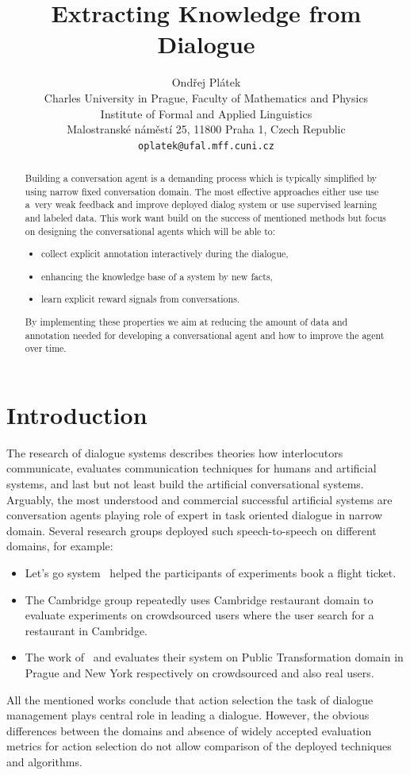 \documentclass[11pt]{article}
\title{Extracting Knowledge from Dialogue}
\author{Ondřej Plátek \\
  Charles University in Prague, Faculty of Mathematics and Physics \\
  Institute of Formal and Applied Linguistics \\
  Malostranské náměstí 25, 11800 Praha 1, Czech Republic\\
  {\tt oplatek@ufal.mff.cuni.cz}\\}
\date{}
\begin{document}
\maketitle
\begin{abstract}
Building a conversation agent is a demanding process which is typically simplified by using narrow fixed conversation domain.
The most effective approaches either use use a~very weak feedback and improve deployed dialog system or use supervised learning and labeled data.
This work want build on the success of mentioned methods but focus on designing the conversational agents which will be able to:
\begin{itemize}
    \item collect explicit annotation interactively during the dialogue,
    \item enhancing the knowledge base of a system by new facts,
    \item learn explicit reward signals from conversations.
\end{itemize}
By implementing these properties we aim at reducing the amount of data and annotation needed for developing a conversational agent and how to improve the agent over time.
\end{abstract}

\section{Introduction}
\label{sec:introduction}
The research of dialogue systems describes theories how interlocutors communicate, evaluates communication techniques for humans and artificial systems, and last but not least build the artificial conversational systems.
Arguably, the most understood and commercial successful artificial systems are conversation agents playing role of expert in task oriented dialogue in narrow domain.
Several research groups deployed such speech-to-speech on different domains, for example:
\begin{itemize}
    \item Let's go system~\cite{raux_lets_2005} helped the participants of experiments book a flight ticket.
    \item The Cambridge group repeatedly uses Cambridge restaurant domain to evaluate experiments on crowdsourced users where the user search for a restaurant in Cambridge.
    \item The work of~\cite{dusek_sequence2sequence_2016} and \cite{vejman_martin_development_2015} evaluates their system on Public Transformation domain in Prague and New York respectively on crowdsourced and also real users. 
\end{itemize}
All the mentioned works conclude that action selection the task of dialogue management plays central role in leading a dialogue.
However, the obvious differences between the domains and absence of widely accepted evaluation metrics for action selection do not allow comparison of the deployed techniques and algorithms.
\end{document}
